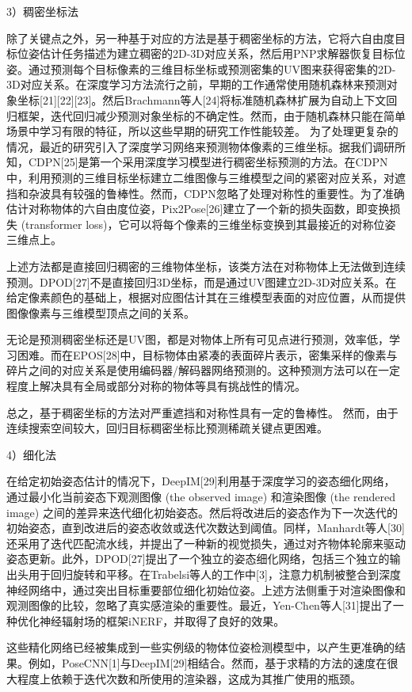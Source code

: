 \documentclass[12pt]{article}
\begin{document}
3）稠密坐标法

除了关键点之外，另一种基于对应的方法是基于稠密坐标的方法，它将六自由度目标位姿估计任务描述为建立稠密的2D-3D对应关系，然后用PNP求解器恢复目标位姿。通过预测每个目标像素的三维目标坐标或预测密集的UV图来获得密集的2D-3D对应关系。在深度学习方法流行之前，早期的工作通常使用随机森林来预测对象坐标[21][22][23]。然后Brachmann等人[24]将标准随机森林扩展为自动上下文回归框架，迭代回归减少预测对象坐标的不确定性。然而，由于随机森林只能在简单场景中学习有限的特征，所以这些早期的研究工作性能较差。 为了处理更复杂的情况，最近的研究引入了深度学习网络来预测物体像素的三维坐标。据我们调研所知，CDPN[25]是第一个采用深度学习模型进行稠密坐标预测的方法。在CDPN中，利用预测的三维目标坐标建立二维图像与三维模型之间的紧密对应关系，对遮挡和杂波具有较强的鲁棒性。然而，CDPN忽略了处理对称性的重要性。为了准确估计对称物体的六自由度位姿，Pix2Pose[26]建立了一个新的损失函数，即变换损失 (transformer loss)，它可以将每个像素的三维坐标变换到其最接近的对称位姿三维点上。

上述方法都是直接回归稠密的三维物体坐标，该类方法在对称物体上无法做到连续预测。DPOD[27]不是直接回归3D坐标，而是通过UV图建立2D-3D对应关系。在给定像素颜色的基础上，根据对应图估计其在三维模型表面的对应位置，从而提供图像像素与三维模型顶点之间的关系。

无论是预测稠密坐标还是UV图，都是对物体上所有可见点进行预测，效率低，学习困难。而在EPOS[28]中，目标物体由紧凑的表面碎片表示，密集采样的像素与碎片之间的对应关系是使用编码器/解码器网络预测的。这种预测方法可以在一定程度上解决具有全局或部分对称的物体等具有挑战性的情况。

总之，基于稠密坐标的方法对严重遮挡和对称性具有一定的鲁棒性。 然而，由于连续搜索空间较大，回归目标稠密坐标比预测稀疏关键点更困难。

4）细化法

在给定初始姿态估计的情况下，DeepIM[29]利用基于深度学习的姿态细化网络，通过最小化当前姿态下观测图像 (the observed image) 和渲染图像 (the rendered image) 之间的差异来迭代细化初始姿态。然后将改进后的姿态作为下一次迭代的初始姿态，直到改进后的姿态收敛或迭代次数达到阈值。同样，Manhardt等人[30]还采用了迭代匹配流水线，并提出了一种新的视觉损失，通过对齐物体轮廓来驱动姿态更新。此外，DPOD[27]提出了一个独立的姿态细化网络，包括三个独立的输出头用于回归旋转和平移。在Trabelsi等人的工作中[3]，注意力机制被整合到深度神经网络中，通过突出目标重要部位细化初始位姿。上述方法侧重于对渲染图像和观测图像的比较，忽略了真实感渲染的重要性。最近，Yen-Chen等人[31]提出了一种优化神经辐射场的框架iNERF，并取得了良好的效果。

这些精化网络已经被集成到一些实例级的物体位姿检测模型中，以产生更准确的结果。例如，PoseCNN[1]与DeepIM[29]相结合。然而，基于求精的方法的速度在很大程度上依赖于迭代次数和所使用的渲染器，这成为其推广使用的瓶颈。 
\end{document}
